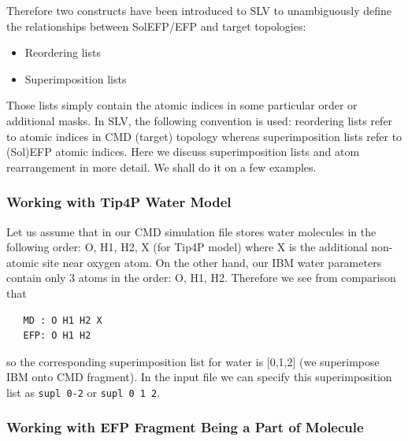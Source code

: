 \documentclass[a4paper,titlepage,twoside,fleqn,12pt]{book}
\begin{document}
\begin{refsection}
Therefore two constructs have been introduced to SLV to unambiguously define the relationships
between SolEFP/EFP and target topologies:
%
\begin{itemize}
\item Reordering lists
\item Superimposition lists
\end{itemize}
%
Those lists simply contain the atomic indices in some particular order or additional masks. In SLV, the
following convention is used: reordering lists refer to atomic indices in CMD (target) topology whereas
superimposition lists refer to (Sol)EFP atomic indices.
Here we discuss superimposition lists and atom rearrangement
in more detail. We shall do it on a few examples.

\subsubsection{Working with Tip4P Water Model}

Let us assume that in our CMD simulation file stores water molecules in the following order: 
O, H1, H2, X (for Tip4P model) where X is the additional non\hyp{}atomic
site near oxygen atom. On the other hand, our IBM water parameters
contain only 3 atoms in the order: O, H1, H2. Therefore we see from comparison that
%
\begin{verbatim}
   MD : O H1 H2 X
   EFP: O H1 H2
\end{verbatim}
%
so the corresponding superimposition list for water is [0,1,2] (we superimpose IBM onto CMD
fragment). In the input file we can specify this superimposition
list as {\tt supl 0-2} or {\tt supl 0 1 2}.

\subsubsection{Working with EFP Fragment Being a Part of Molecule}


\end{refsection}
\end{document}
